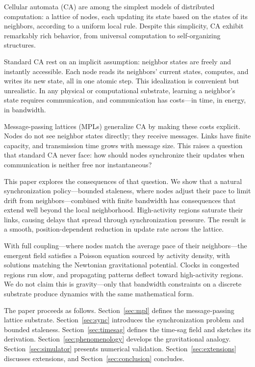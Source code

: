 \documentclass[aps, pra, reprint, superscriptaddress, nofootinbib, singlespacing]{revtex4-2}
\begin{document}
Cellular automata (CA) are among the simplest models of distributed computation: a lattice of nodes, each updating its state based on the states of its neighbors, according to a uniform local rule. Despite this simplicity, CA exhibit remarkably rich behavior, from universal computation to self-organizing structures.

Standard CA rest on an implicit assumption: neighbor states are freely and instantly accessible. Each node reads its neighbors' current states, computes, and writes its new state, all in one atomic step. This idealization is convenient but unrealistic. In any physical or computational substrate, learning a neighbor's state requires communication, and communication has costs—in time, in energy, in bandwidth.

Message-passing lattices (MPLs) generalize CA by making these costs explicit. Nodes do not see neighbor states directly; they receive messages. Links have finite capacity, and transmission time grows with message size. This raises a question that standard CA never face: how should nodes synchronize their updates when communication is neither free nor instantaneous?

This paper explores the consequences of that question. We show that a natural synchronization policy—bounded staleness, where nodes adjust their pace to limit drift from neighbors—combined with finite bandwidth has consequences that extend well beyond the local neighborhood. High-activity regions saturate their links, causing delays that spread through synchronization pressure. The result is a smooth, position-dependent reduction in update rate across the lattice.

With full coupling—where nodes match the average pace of their neighbors—the emergent field satisfies a Poisson equation sourced by activity density, with solutions matching the Newtonian gravitational potential. Clocks in congested regions run slow, and propagating patterns deflect toward high-activity regions. We do not claim this is gravity—only that bandwidth constraints on a discrete substrate produce dynamics with the same mathematical form.

The paper proceeds as follows. Section~\ref{sec:mpl} defines the message-passing lattice substrate. Section~\ref{sec:sync} introduces the synchronization problem and bounded staleness. Section~\ref{sec:timesag} defines the time-sag field and sketches its derivation. Section~\ref{sec:phenomenology} develops the gravitational analogy. Section~\ref{sec:simulator} presents numerical validation. Section~\ref{sec:extensions} discusses extensions, and Section~\ref{sec:conclusion} concludes.
\end{document}
